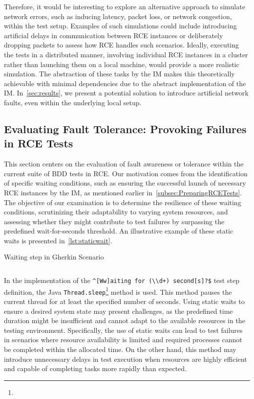 Therefore, it would be interesting to explore an alternative approach to simulate network errors, such as inducing latency, packet loss, or network congestion, within the test setup. Examples of such simulations could include introducing artificial delays in communication between \ac{RCE} instances or deliberately dropping packets to assess how \ac{RCE} handles such scenarios. Ideally, executing the tests in a distributed manner, involving individual \ac{RCE} instances in a cluster rather than launching them on a local machine, would provide a more realistic simulation. The abstraction of these tasks by the \ac{IM} makes this theoretically achievable with minimal dependencies due to the abstract implementation of the \ac{IM}. In~\cref{sec:results}, we present a potential solution to introduce artificial network faults, even within the underlying local setup.

\subsection{Evaluating Fault Tolerance: Provoking Failures in \ac{RCE} Tests}
\label{subsec:staticwaits}
This section centers on the evaluation of fault awareness or tolerance within the current suite of \ac{BDD} tests in \ac{RCE}. Our motivation comes from the identification of specific waiting conditions, such as ensuring the successful launch of necessary RCE instances by the \ac{IM}, as mentioned earlier in~\cref{subsec:PreparingRCETests}. The objective of our examination is to determine the resilience of these waiting conditions, scrutinizing their adaptability to varying system resources, and assessing whether they might contribute to test failures by surpassing the predefined wait-for-seconds threshold. An illustrative example of these static waits is presented in~\cref{lst:staticwait}.

\begin{listing}[!ht]
\caption{Waiting step in Gherkin Scenario}
\label{lst:staticwait}
\inputminted{gherkin}{files/code/staticwait.feature}
\end{listing}

In the implementation of the \verb|^[Ww]aiting for (\\d+) second[s]?$| test step definition, the Java \texttt{Thread.sleep}\footnote{} method is used. This method pauses the current thread for at least the specified number of seconds. Using static waits to ensure a desired system state may present challenges, as the predefined time duration might be insufficient and cannot adapt to the available resources in the testing environment. Specifically, the use of static waits can lead to test failures in scenarios where resource availability is limited and required processes cannot be completed within the allocated time. On the other hand, this method may introduce unnecessary delays in test execution when resources are highly efficient and capable of completing tasks more rapidly than expected.

